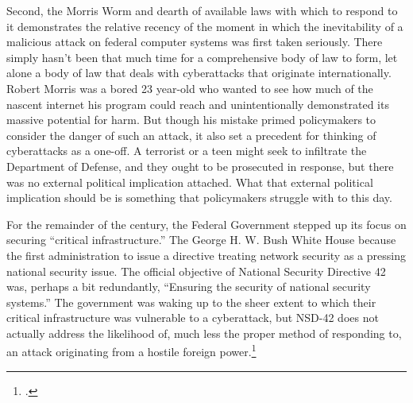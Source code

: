 \documentclass{memoir}
\begin{document}
\begin{refsegment}
Second, the Morris Worm and dearth of available laws with which to respond to it demonstrates the relative recency of the moment in which the inevitability of a malicious attack on federal computer systems was first taken seriously. There simply hasn't been that much time for a comprehensive body of law to form, let alone a body of law that deals with cyberattacks that originate internationally. Robert Morris was a bored 23 year-old who wanted to see how much of the nascent internet his program could reach and unintentionally demonstrated its massive potential for harm. But though his mistake primed policymakers to consider the danger of such an attack, it also set a precedent for thinking of cyberattacks as a one-off. A terrorist or a teen might seek to infiltrate the Department of Defense, and they ought to be prosecuted in response, but there was no external political implication attached. What that external political implication should be is something that policymakers struggle with to this day.

For the remainder of the  century, the Federal Government stepped up its focus on securing ``critical infrastructure.'' The George H. W. Bush White House because the first administration to issue a directive treating network security as a pressing national security issue. The official objective of National Security Directive 42 was, perhaps a bit redundantly, ``Ensuring the security of national security systems.'' The government was waking up to the sheer extent to which their critical infrastructure was vulnerable to a cyberattack, but NSD-42 does not actually address the likelihood of, much less the proper method of responding to, an attack originating from a hostile foreign power.\footcite{bush_national_1990}


\end{refsegment}
\end{document}
